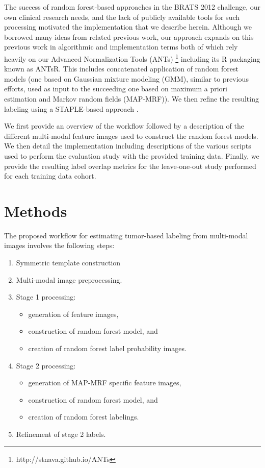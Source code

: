\documentclass{llncs}
\begin{document}
The success of random forest-based approaches in the BRATS 2012 challenge, our 
own clinical research needs, and the lack of publicly available tools for such processing motivated the implementation that we describe herein.   Although we
borrowed many ideas from related previous work, our approach expands on this previous work in algorithmic and implementation terms both of which rely 
heavily on our Advanced Normalization Tools (ANTs)%
\footnote{
http://stnava.github.io/ANTs
} including its R packaging known as ANTsR.  
This includes concatenated application of random forest models (one based on Gaussian mixture modeling (GMM), similar to previous efforts, used as input to the succeeding one based on maximum a priori estimation and Markov random fields (MAP-MRF)).  We then refine the resulting labeling using a STAPLE-based approach \cite{warfield2004}.

We first provide an overview of the workflow followed by a description of the different multi-modal feature images used to construct the random forest models.  We then detail the implementation including descriptions of the various scripts used to perform the evaluation study with the provided training data.  Finally, we provide the resulting label overlap metrics for the leave-one-out study performed for each training data cohort.

\section{Methods}

The proposed workflow for estimating tumor-based labeling from multi-modal images involves the following steps:
\begin{enumerate}
  \item Symmetric template construction
  \item Multi-modal image preprocessing.
  \item Stage 1 processing:
  \begin{itemize}
    \item generation of feature images,
    \item construction of random forest model, and
    \item creation of random forest label probability images.
  \end{itemize}
  \item Stage 2 processing:
  \begin{itemize}
    \item generation of MAP-MRF specific feature images,
    \item construction of random forest model, and
    \item creation of random forest labelings.
  \end{itemize}
  \item Refinement of stage 2 labels.
\end{enumerate}
\end{document}
